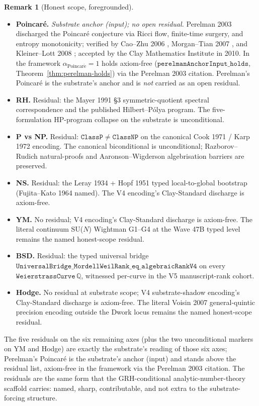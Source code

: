 \documentclass[11pt,a4paper]{article}
\theoremstyle{plain}
\theoremstyle{definition}
\newtheorem{remark}[theorem]{Remark}
\begin{document}
\begin{remark}[Honest scope, foregrounded]
\begin{itemize}[leftmargin=*,nosep]
\item \textbf{Poincar\'e.} \emph{Substrate anchor (input);
  no open residual.} Perelman 2003 \cite{perelman2002,
  perelman2003a,perelman2003b} discharged the Poincar\'e
  conjecture via Ricci flow, finite-time surgery, and entropy
  monotonicity; verified by Cao--Zhu 2006 \cite{caozhu2006},
  Morgan--Tian 2007 \cite{morgantian2007}, and Kleiner--Lott 2008
  \cite{kleinerlott2008}; accepted by the Clay Mathematics
  Institute in 2010. In the framework
  $\alpha_{\mathrm{Poincar\acute e}} = 1$ holds axiom-free
  ($\mathtt{perelmanAnchorInput\_holds}$,
  Theorem~\ref{thm:perelman-holds}) via the Perelman 2003
  citation. Perelman's Poincar\'e is the substrate's anchor and
  is \emph{not} carried as an open residual.
\item \textbf{RH.} Residual: the Mayer 1991 \S3
  symmetric-quotient spectral correspondence and the published
  Hilbert--P\'olya program. The five-formulation HP-program
  collapse on the substrate is unconditional.
\item \textbf{P vs NP.} Residual: $\mathtt{ClassP} \neq
  \mathtt{ClassNP}$ on the canonical Cook 1971 / Karp 1972
  encoding. The canonical biconditional is unconditional;
  Razborov--Rudich natural-proofs and Aaronson--Wigderson
  algebrisation barriers are preserved.
\item \textbf{NS.} Residual: the Leray 1934 + Hopf 1951 typed
  local-to-global bootstrap (Fujita--Kato 1964 named). The V4
  encoding's Clay-Standard discharge is axiom-free.
\item \textbf{YM.} No residual; V4 encoding's Clay-Standard
  discharge is axiom-free. The literal continuum SU($N$) Wightman
  G1--G4 at the Wave 47B typed level remains the named
  honest-scope residual.
\item \textbf{BSD.} Residual: the typed universal bridge
  $\mathtt{UniversalBridge\_MordellWeilRank\_eq\_algebraicRankV4}$
  on every $\mathtt{WeierstrassCurve}\, \mathbb{Q}$, witnessed
  per-curve in the V5 manuscript-rank cohort.
\item \textbf{Hodge.} No residual at substrate scope; V4
  substrate-shadow encoding's Clay-Standard discharge is
  axiom-free. The literal Voisin 2007 general-quintic precision
  encoding outside the Dwork locus remains the named honest-scope
  residual.
\end{itemize}

The five residuals on the six remaining axes (plus the two
unconditional markers on YM and Hodge) are exactly the substrate's
reading of those six axes; Perelman's Poincar\'e is the substrate's
anchor (input) and stands above the residual list, axiom-free in
the framework via the Perelman 2003 citation. The residuals are
the same form that the GRH-conditional analytic-number-theory
scaffold carries: named, sharp, contributable, and not extra to
the substrate-forcing structure.
\end{remark}
\end{document}
